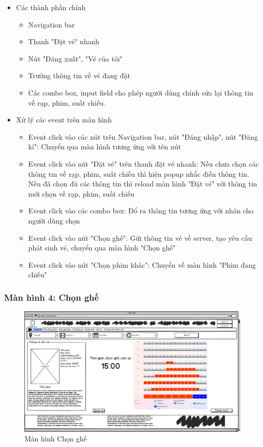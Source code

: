 \documentclass[a4paper, 12pt]{article}
\begin{document}
\begin{itemize}
	\item Các thành phần chính
	\begin{itemize}
		\item Navigation bar
		\item Thanh "Đặt vé" nhanh
		\item Nút "Đăng xuất", "Vé của tôi"
		\item Trường thông tin về vé đang đặt
		\item Các combo box, input field cho phép người dùng chỉnh sửa lại thông tin về rạp, phim, suất chiếu.
	\end{itemize}

	\item Xử lý các event trên màn hình
	\begin{itemize}
		\item Event click vào các nút trên Navigation bar, nút "Đăng nhập", nút "Đăng kí": Chuyển qua màn hình tương ứng với tên nút
		\item Event click vào nút "Đặt vé" trên thanh đặt vé nhanh: Nếu chưa chọn các thông tin về rạp, phim, suất chiếu thì hiện popup nhắc điền thông tin. Nếu đã chọn đủ các thông tin thì reload màn hình "Đặt vé" với thông tin mới chọn về rạp, phim, suất chiếu
		\item Event click vào các combo box: Đổ ra thông tin tương ứng với nhãn cho người dùng chọn
		\item Event click vào nút "Chọn ghế": Gửi thông tin vé về server, tạo yêu cầu phát sinh vé, chuyển qua màn hình "Chọn ghế"
		\item Event click vào nút "Chọn phim khác": Chuyển về màn hình "Phim đang chiếu"
	\end{itemize}
\end{itemize}

\subsubsection{Màn hình 4: Chọn ghế}

\begin{figure}[H]
	\begin{center}
		\includegraphics[scale = 0.25]{Wireframe/User/Chọn ghế.png}
		\caption{Màn hình Chọn ghế}
	\end{center}
\end{figure}
\end{document}
